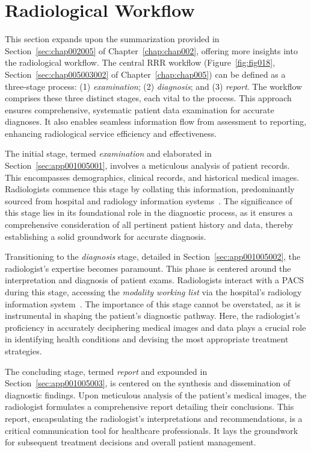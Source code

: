 \section{Radiological Workflow}
\label{sec:app001005}

This section expands upon the summarization provided in Section~\ref{sec:chap002005} of Chapter~\ref{chap:chap002}, offering more insights into the radiological workflow.
The central \ac{RRR} workflow \textcolor{revised}{(Figure~\ref{fig:fig018}, Section~\ref{sec:chap005003002} of Chapter~\ref{chap:chap005})} can be defined as a three-stage process:
(1) {\it examination};
(2) {\it diagnosis}; and
(3) {\it report}.
The workflow comprises these three distinct stages, each vital to the process.
This approach ensures comprehensive, systematic patient data examination for accurate diagnoses.
It also enables seamless information flow from assessment to reporting, enhancing radiological service efficiency and effectiveness.

\textcolor{revised}{The initial stage, termed {\it examination} and elaborated in Section~\ref{sec:app001005001}, involves a meticulous analysis of patient records.
This encompasses demographics, clinical records, and historical medical images.
Radiologists commence this stage by collating this information, predominantly sourced from hospital and radiology information systems~\cite{islam2018recent}.
The significance of this stage lies in its foundational role in the diagnostic process, as it ensures a comprehensive consideration of all pertinent patient history and data, thereby establishing a solid groundwork for accurate diagnosis.}

\textcolor{revised}{Transitioning to the {\it diagnosis} stage, detailed in Section~\ref{sec:app001005002}, the radiologist's expertise becomes paramount.
This phase is centered around the interpretation and diagnosis of patient exams.
Radiologists interact with a \ac{PACS} during this stage, accessing the {\it modality working list} via the hospital's radiology information system~\cite{DIROBERTO2016950}.
The importance of this stage cannot be overstated, as it is instrumental in shaping the patient's diagnostic pathway.
Here, the radiologist's proficiency in accurately deciphering medical images and data plays a crucial role in identifying health conditions and devising the most appropriate treatment strategies.}

\textcolor{revised}{The concluding stage, termed {\it report} and expounded in Section~\ref{sec:app001005003}, is centered on the synthesis and dissemination of diagnostic findings.
Upon meticulous analysis of the patient's medical images, the radiologist formulates a comprehensive report detailing their conclusions.
This report, encapsulating the radiologist's interpretations and recommendations, is a critical communication tool for healthcare professionals.
It lays the groundwork for subsequent treatment decisions and overall patient management.}

